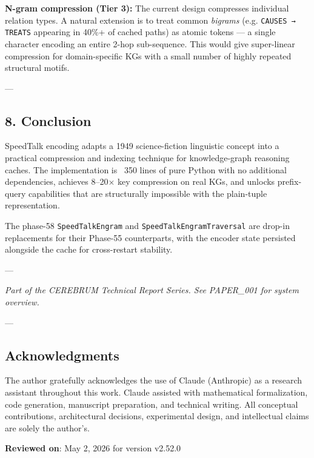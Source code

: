 \textbf{N-gram compression (Tier 3):} The current design compresses individual relation
types.  A natural extension is to treat common \textit{bigrams} (e.g. \texttt{CAUSES → TREATS}
appearing in 40\%+ of cached paths) as atomic tokens — a single character encoding
an entire 2-hop sub-sequence.  This would give super-linear compression for
domain-specific KGs with a small number of highly repeated structural motifs.

---

\subsection{8. Conclusion}

SpeedTalk encoding adapts a 1949 science-fiction linguistic concept into a
practical compression and indexing technique for knowledge-graph reasoning caches.
The imple\-mentation is ~350 lines of pure Python with no additional depen\-dencies,
achieves 8–20$\times$ key compression on real KGs, and unlocks prefix-query capab\-ilities
that are struc\-turally impossible with the plain-tuple repre\-sentation.

The phase-58 \texttt{SpeedTalkEngram} and \texttt{SpeedTalkEngramTraversal} are drop-in
repla\-cements for their Phase-55 count\-erparts, with the encoder state persisted
alongside the cache for cross-restart stability.

---

\textit{Part of the CEREBRUM Technical Report Series. See PAPER\_001 for system overview.}

---
\subsection{Acknow\-ledgments}

The author gratefully ackno\-wledges the use of Claude (Anthropic) as a research assistant throughout this work. Claude assisted with mathe\-matical forma\-lization, code generation, manuscript preparation, and technical writing. All conceptual contr\-ibutions, archi\-tectural decisions, exper\-imental design, and intel\-lectual claims are solely the author's.

\textbf{Reviewed on}: May 2, 2026 for version v2.52.0
